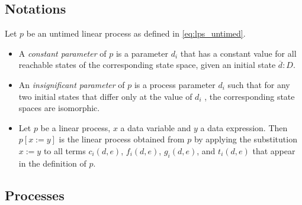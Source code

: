 \documentclass{article}
\begin{document}
\subsection{Notations}

Let $p$ be an untimed linear process as defined in \ref{eq:lps_untimed}.

\begin{itemize}
\item A \emph{constant parameter} of $p$ is a parameter $d_{i}$ that has a
constant value for all reachable states of the corresponding state space,
given an initial state $\overline{d}:D$.

\item An \emph{insignificant parameter} of $p$ is a process parameter $d_{i}$
such that for any two initial states that differ only at the value of $d_{i}$%
, the corresponding state spaces are isomorphic.

\item Let $p$ be a linear process, $x$ a data variable and $y$ a data
expression. Then $p[x:=y]$ is the linear process obtained from $p$ by
applying the substitution $x:=y$ to all terms $c_{i}(d,e)$, $f_{i}(d,e)$, $%
g_{i}(d,e)$, and $t_{i}(d,e)$ that appear in the definition of $p$.\newpage
\end{itemize}

\subsection{Processes}
\end{document}
